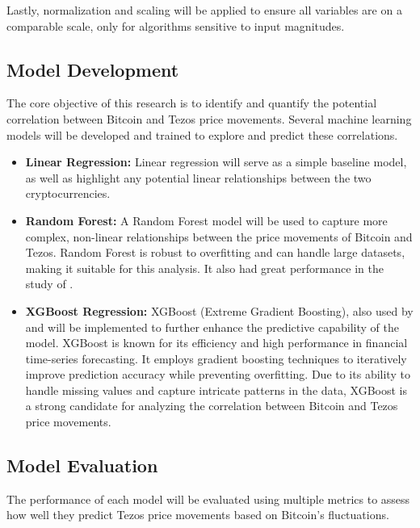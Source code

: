 Lastly, normalization and scaling will be applied to ensure all variables are on a comparable scale, only for algorithms sensitive to input magnitudes.

\subsection{Model Development}

The core objective of this research is to identify and quantify the potential correlation between Bitcoin and Tezos price movements. Several machine learning models will be developed and trained to explore and predict these correlations.

\begin{itemize}
  \item \textbf{Linear Regression:} Linear regression will serve as a simple baseline model, as well as highlight any potential linear relationships between the two cryptocurrencies.
  \item \textbf{Random Forest:} A Random Forest model will be used to capture more complex, non-linear relationships between the price movements of Bitcoin and Tezos. Random Forest is robust to overfitting and can handle large datasets, making it suitable for this analysis. It also had great performance in the study of \textcite{akyildirim2021prediction}.
  \item \textbf{XGBoost Regression:} XGBoost (Extreme Gradient Boosting), also used by \textcite{lauraalessandretti2018anticipating} and  will be implemented to further enhance the predictive capability of the model. XGBoost is known for its efficiency and high performance in financial time-series forecasting. It employs gradient boosting techniques to iteratively improve prediction accuracy while preventing overfitting. Due to its ability to handle missing values and capture intricate patterns in the data, XGBoost is a strong candidate for analyzing the correlation between Bitcoin and Tezos price movements.
\end{itemize}



\subsection{Model Evaluation}
The performance of each model will be evaluated using multiple metrics to assess how well they predict Tezos price movements based on Bitcoin’s fluctuations.

